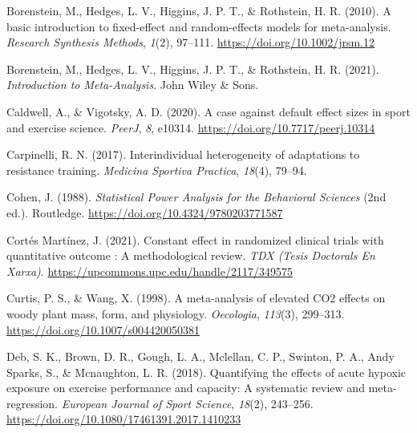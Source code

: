 \documentclass[
]{article}
\newlength{\cslhangindent}
\newlength{\cslentryspacingunit} %
\newenvironment{CSLReferences}[2] %
 {%
  \setlength{\parindent}{0pt}
  \ifodd #1
  \let\oldpar\par
  \def\par{\hangindent=\cslhangindent\oldpar}
  \fi
  \setlength{\parskip}{#2\cslentryspacingunit}
 }%
 {}
\begin{document}
\begin{CSLReferences}{1}{0}
\leavevmode{}%
Borenstein, M., Hedges, L. V., Higgins, J. P. T., \& Rothstein, H. R. (2010). A basic introduction to fixed-effect and random-effects models for meta-analysis. \emph{Research Synthesis Methods}, \emph{1}(2), 97--111. \url{https://doi.org/10.1002/jrsm.12}

\leavevmode{}%
Borenstein, M., Hedges, L. V., Higgins, J. P. T., \& Rothstein, H. R. (2021). \emph{Introduction to {Meta}-{Analysis}}. John Wiley \& Sons.

\leavevmode{}%
Caldwell, A., \& Vigotsky, A. D. (2020). A case against default effect sizes in sport and exercise science. \emph{PeerJ}, \emph{8}, e10314. \url{https://doi.org/10.7717/peerj.10314}

\leavevmode{}%
Carpinelli, R. N. (2017). Interindividual heterogeneity of adaptations to resistance training. \emph{Medicina Sportiva Practica}, \emph{18}(4), 79--94.

\leavevmode{}%
Cohen, J. (1988). \emph{Statistical {Power} {Analysis} for the {Behavioral} {Sciences}} (2nd ed.). Routledge. \url{https://doi.org/10.4324/9780203771587}

\leavevmode{}%
Cortés Martínez, J. (2021). Constant effect in randomized clinical trials with quantitative outcome : A methodological review. \emph{TDX (Tesis Doctorals En Xarxa)}. \url{https://upcommons.upc.edu/handle/2117/349575}

\leavevmode{}%
Curtis, P. S., \& Wang, X. (1998). A meta-analysis of elevated {CO2} effects on woody plant mass, form, and physiology. \emph{Oecologia}, \emph{113}(3), 299--313. \url{https://doi.org/10.1007/s004420050381}

\leavevmode{}%
Deb, S. K., Brown, D. R., Gough, L. A., Mclellan, C. P., Swinton, P. A., Andy Sparks, S., \& Mcnaughton, L. R. (2018). Quantifying the effects of acute hypoxic exposure on exercise performance and capacity: {A} systematic review and meta-regression. \emph{European Journal of Sport Science}, \emph{18}(2), 243--256. \url{https://doi.org/10.1080/17461391.2017.1410233}


\end{CSLReferences}
\end{document}
